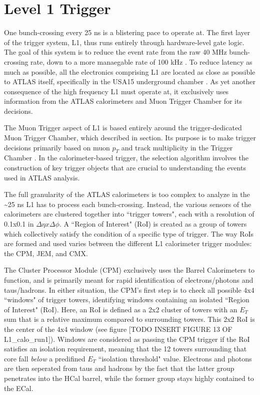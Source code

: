 \section{Level 1 Trigger}
    One bunch-crossing every 25 ns is a blistering pace to operate at.
    The first layer of the trigger system, L1, thus runs entirely through hardware-level gate logic.
    The goal of this system is to reduce the event rate from the raw 40 MHz bunch-crossing rate, down to a more manaegable rate of 100 kHz \cite{trigger_run2}.
    To reduce latency as much as possible, all the electronics comprising L1 are located as close as possible to ATLAS itself, specifically in the USA15 underground chamber \cite{trigger_tdr}.
    As yet another consequence of the high frequency L1 must operate at, it exclusively uses information from the ATLAS calorimeters and Muon Trigger Chamber for its decisions.

    The Muon Trigger aspect of L1 is based entirely around the trigger-dedicated Muon Trigger Chamber, which described in section. %
    Its purpose is to make trigger decisions primarily based on muon $p_T$ and track multiplicity in the Trigger Chamber  \cite{trigger_run1}.
    In the calorimeter-based trigger, the selection algorithm involves the construction of key trigger objects that are crucial to understanding the events used in ATLAS analysis.

    The full granularity of the ATLAS calorimeters is too complex to analyze in the \textasciitilde 25 ns L1 has to process each bunch-crossing.
    Instead, the various sensors of the calorimeters are clustered together into ``trigger towers", each with a resolution of 0.1x0.1 in $\Delta \eta x \Delta \phi$.
    A ``Region of Interest" (RoI) is created as a group of towers which collectively satisfy the condition of a specific type of trigger.
    The way RoIs are formed and used varies between the different L1 calorimeter trigger modules: the CPM, JEM, and CMX.

    The Cluster Processor Module (CPM) exclusively uses the Barrel Calorimeters to function, and is primarily meant for rapid identification of electrons/photons and taus/hadrons.
    In either situation, the CPM's first step is to check all possible 4x4 ``windows" of trigger towers, identifying windows containing an isolated ``Region of Interest" (RoI).
    Here, an RoI is defined as a 2x2 cluster of towers with an $E_T$ sum that is a relative maximum compared to surrounding towers.
    This 2x2 RoI is the center of the 4x4 window (see figure [TODO INSERT FIGURE 13 OF L1_calo_run1]).
    Windows are considered as passing the CPM trigger if the RoI satisfies an isolation requirement, meaning that the 12 towers surrounding that core fall \textit{below} a predifined $E_T$ ``isolation threshold" value.
    Electrons and photons are then seperated from taus and hadrons by the fact that the latter group penetrates into the HCal barrel, while the former group stays highly contained to the ECal.

